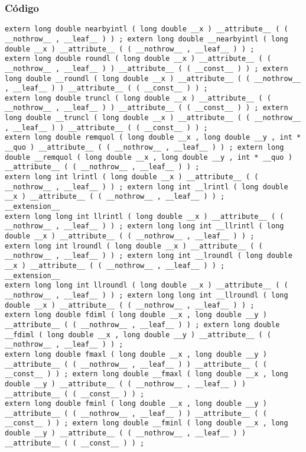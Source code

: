 \documentclass{beamer}
\begin{document}
\begin{frame}[fragile]
\frametitle{C\'odigo}
\begin{verbatim}
extern long double nearbyintl ( long double __x ) __attribute__ ( ( __nothrow__ , __leaf__ ) ) ; extern long double __nearbyintl ( long double __x ) __attribute__ ( ( __nothrow__ , __leaf__ ) ) ; 
extern long double roundl ( long double __x ) __attribute__ ( ( __nothrow__ , __leaf__ ) ) __attribute__ ( ( __const__ ) ) ; extern long double __roundl ( long double __x ) __attribute__ ( ( __nothrow__ , __leaf__ ) ) __attribute__ ( ( __const__ ) ) ; 
extern long double truncl ( long double __x ) __attribute__ ( ( __nothrow__ , __leaf__ ) ) __attribute__ ( ( __const__ ) ) ; extern long double __truncl ( long double __x ) __attribute__ ( ( __nothrow__ , __leaf__ ) ) __attribute__ ( ( __const__ ) ) ; 
extern long double remquol ( long double __x , long double __y , int * __quo ) __attribute__ ( ( __nothrow__ , __leaf__ ) ) ; extern long double __remquol ( long double __x , long double __y , int * __quo ) __attribute__ ( ( __nothrow__ , __leaf__ ) ) ; 
extern long int lrintl ( long double __x ) __attribute__ ( ( __nothrow__ , __leaf__ ) ) ; extern long int __lrintl ( long double __x ) __attribute__ ( ( __nothrow__ , __leaf__ ) ) ; 
__extension__ 
extern long long int llrintl ( long double __x ) __attribute__ ( ( __nothrow__ , __leaf__ ) ) ; extern long long int __llrintl ( long double __x ) __attribute__ ( ( __nothrow__ , __leaf__ ) ) ; 
extern long int lroundl ( long double __x ) __attribute__ ( ( __nothrow__ , __leaf__ ) ) ; extern long int __lroundl ( long double __x ) __attribute__ ( ( __nothrow__ , __leaf__ ) ) ; 
__extension__ 
extern long long int llroundl ( long double __x ) __attribute__ ( ( __nothrow__ , __leaf__ ) ) ; extern long long int __llroundl ( long double __x ) __attribute__ ( ( __nothrow__ , __leaf__ ) ) ; 
extern long double fdiml ( long double __x , long double __y ) __attribute__ ( ( __nothrow__ , __leaf__ ) ) ; extern long double __fdiml ( long double __x , long double __y ) __attribute__ ( ( __nothrow__ , __leaf__ ) ) ; 
extern long double fmaxl ( long double __x , long double __y ) __attribute__ ( ( __nothrow__ , __leaf__ ) ) __attribute__ ( ( __const__ ) ) ; extern long double __fmaxl ( long double __x , long double __y ) __attribute__ ( ( __nothrow__ , __leaf__ ) ) __attribute__ ( ( __const__ ) ) ; 
extern long double fminl ( long double __x , long double __y ) __attribute__ ( ( __nothrow__ , __leaf__ ) ) __attribute__ ( ( __const__ ) ) ; extern long double __fminl ( long double __x , long double __y ) __attribute__ ( ( __nothrow__ , __leaf__ ) ) __attribute__ ( ( __const__ ) ) ; 
\end{verbatim}
\end{frame}
\end{document}
